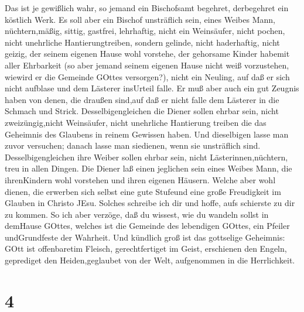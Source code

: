 Das ist je gewißlich wahr, so jemand ein Bischofsamt
begehret, derbegehret ein köstlich Werk.  Es soll aber ein
Bischof unsträflich sein, eines Weibes Mann, nüchtern,mäßig, sittig,
gastfrei, lehrhaftig,  nicht ein Weinsäufer, nicht pochen,
nicht unehrliche Hantierungtreiben, sondern gelinde, nicht haderhaftig,
nicht geizig,  der seinem eigenen Hause wohl vorstehe, der
gehorsame Kinder habemit aller Ehrbarkeit  (so aber jemand
seinem eigenen Hause nicht weiß vorzustehen, wiewird er die Gemeinde
GOttes versorgen?),  nicht ein Neuling, auf daß er sich
nicht aufblase und dem Lästerer insUrteil falle.  Er muß
aber auch ein gut Zeugnis haben von denen, die draußen sind,auf daß er
nicht falle dem Lästerer in die Schmach und Strick. 
Desselbigengleichen die Diener sollen ehrbar sein, nicht
zweizüngig,nicht Weinsäufer, nicht unehrliche Hantierung treiben
 die das Geheimnis des Glaubens in reinem Gewissen haben.
 Und dieselbigen lasse man zuvor versuchen; danach lasse
man siedienen, wenn sie unsträflich sind. 
Desselbigengleichen ihre Weiber sollen ehrbar sein, nicht
Lästerinnen,nüchtern, treu in allen Dingen.  Die Diener laß
einen jeglichen sein eines Weibes Mann, die ihrenKindern wohl vorstehen
und ihren eigenen Häusern.  Welche aber wohl dienen, die
erwerben sich selbst eine gute Stufeund eine große Freudigkeit im
Glauben in Christo JEsu.  Solches schreibe ich dir und
hoffe, aufs schierste zu dir zu kommen.  So ich aber
verzöge, daß du wissest, wie du wandeln sollst in demHause GOttes,
welches ist die Gemeinde des lebendigen GOttes, ein Pfeiler
undGrundfeste der Wahrheit.  Und kündlich groß ist das
gottselige Geheimnis: GOtt ist offenbaretim Fleisch, gerechtfertiget im
Geist, erschienen den Engeln, geprediget den Heiden,geglaubet von der
Welt, aufgenommen in die Herrlichkeit.

\hypertarget{section-3}{%
\section{4}\label{section-3}}

